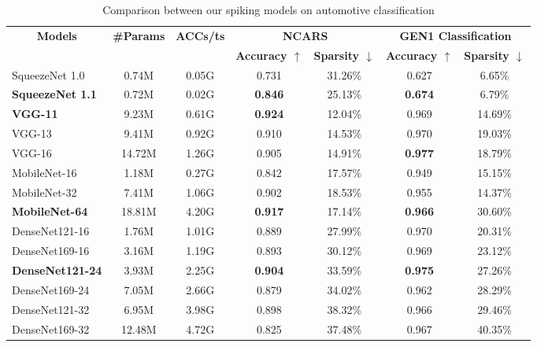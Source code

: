 \documentclass[conference]{IEEEtran}
\begin{document}
\begin{table*}[]
\renewcommand{\arraystretch}{1.3}
\centering
\caption{Comparison between our spiking models on automotive classification}
\begin{tabular}{lcccccc}
\hline
\multicolumn{1}{c}{\multirow{2}{*}{\textbf{Models}}} & \multicolumn{1}{c}{\multirow{2}{*}{\textbf{\#Params}}} & \multicolumn{1}{c}{\multirow{2}{*}{\textbf{ACCs/ts}}} & \multicolumn{2}{c}{\textbf{NCARS}}                                   & \multicolumn{2}{c}{\textbf{GEN1 Classification}}        \\ 
\multicolumn{1}{c}{}                        & \multicolumn{1}{c}{}                          & \multicolumn{1}{c}{}                     & \multicolumn{1}{c}{\textbf{Accuracy $\uparrow$}} & \multicolumn{1}{c}{\textbf{Sparsity $\downarrow$}} & \multicolumn{1}{c}{\textbf{Accuracy $ \uparrow$}} & \multicolumn{1}{c}{\textbf{Sparsity $\downarrow$}} \\
\hline
SqueezeNet 1.0 & 0.74M & 0.05G        & 0.731 & 31.26\% & 0.627 & 6.65\%   \\
\textbf{SqueezeNet 1.1} & 0.72M & 0.02G        & \textbf{0.846} & 25.13\% & \textbf{0.674} & 6.79\%  \\
\hline
\textbf{VGG-11}     & 9.23M  & 0.61G        & \textbf{0.924} & 12.04\% & 0.969 & 14.69\%   \\ 
VGG-13     & 9.41M  & 0.92G        & 0.910 & 14.53\% & 0.970 & 19.03\%    \\ 
VGG-16     & 14.72M  & 1.26G       & 0.905 & 14.91\% & \textbf{0.977} & 18.79\%   \\ 
\hline
MobileNet-16  & 1.18M & 0.27G         & 0.842      &  17.57\% & 0.949 & 15.15\%        \\
MobileNet-32 & 7.41M & 1.06G         & 0.902   & 18.53\% & 0.955 & 14.37\%        \\
\textbf{MobileNet-64} & 18.81M & 4.20G         & \textbf{0.917}      & 17.14\%  & \textbf{0.966} & 30.60\%         \\
\hline
DenseNet121-16   & 1.76M   & 1.01G          & 0.889 & 27.99\% & 0.970 & 20.31\%   \\ 
DenseNet169-16   & 3.16M   & 1.19G          & 0.893 & 30.12\% & 0.969 & 23.12\%   \\ 
\textbf{DenseNet121-24}   & 3.93M   & 2.25G          & \textbf{0.904} & 33.59\% & \textbf{0.975} & 27.26\%   \\ 
DenseNet169-24   & 7.05M   & 2.66G          & 0.879 & 34.02\% & 0.962 & 28.29\%   \\ 
DenseNet121-32   & 6.95M   & 3.98G          & 0.898 & 38.32\% & 0.966 & 29.46\%   \\ 
DenseNet169-32   & 12.48M   & 4.72G         & 0.825 & 37.48\% & 0.967 & 40.35\%   \\ 

\hline
\end{tabular}
\label{tab:autoclassif}
\end{table*}
\end{document}
